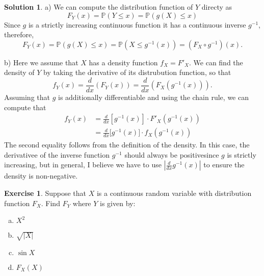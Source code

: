\documentclass[12pt]{article}
\newcommand{\Prob}{\mathbb{P}}
\newcommand{\abs}[1]{ \left| #1 \right| }
\newcommand{\diff}[2]{\frac{d #1}{d #2}}
\theoremstyle{definition}
\newtheorem{exer}{Exercise}
\newtheorem{sol}{Solution}
\theoremstyle{remark}
\begin{document}
\begin{sol}\leavevmode
    
    a) We can compute the distribution function of $Y$ directy as
    \begin{equation}
        F_Y(x) = \Prob(Y\leq x) = \Prob(g(X)\leq x)
    \end{equation}
    Since $g$ is a strictly increasing continuous function it has a continuous inverse $g^{-1}$, therefore,
    \begin{equation}
        F_Y(x) = \Prob(g(X)\leq x) = \Prob(X \leq g^{-1}(x)) = (F_X\circ g^{-1})(x).
    \end{equation}
    
    b) Here we assume that $X$ has a density function $f_X = F'_X$. We can find the density of $Y$ by taking the derivative of its distrubution function, so that
    \begin{equation}
        f_Y(x) = \diff{}{x}(F_Y(x)) = \diff{}{x}(F_X(g^{-1}(x))).
    \end{equation}
    Assuming that $g$ is additionally differentiable and using the chain rule, we can compute that
    \begin{align}
        f_Y(x) &= \diff{}{x} \left[g^{-1}(x)\right] \cdot F'_X(g^{-1}(x))\\
               &= \diff{}{x} \big[ g^{-1}(x) \big]\cdot f_X(g^{-1}(x))
    \end{align}
    The second equality follows from the definition of the density. In this case, the derivativee of the inverse function $g^{-1}$ should always be positivesince $g$ is strictly increasing, but in general, I believe we have to use $\abs{\diff{}{x}g^{-1}(x)}$ to ensure the density is non-negative.
\end{sol}

\newpage
\begin{exer}
Suppose that $X$ is a continuous random variable with distribution function $F_X$. Find $F_Y$ where $Y$ is given by:
\begin{enumerate}[a)]
    \item $X^2$
    \item $\sqrt{\abs{X}}$
    \item $\sin X$
    \item $F_X(X)$
\end{enumerate}
\end{exer}
\end{document}
